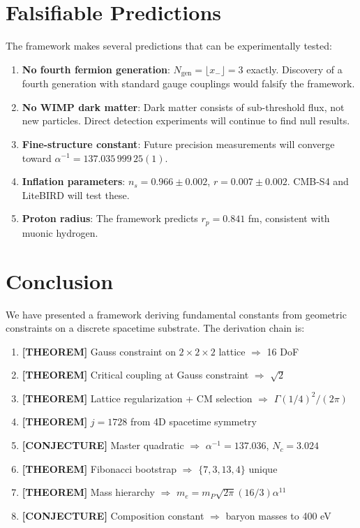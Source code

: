\documentclass[aps,prd,twocolumn,10pt,groupedaddress,superscriptaddress]{revtex4-2}
\begin{document}
\section{Falsifiable Predictions}

The framework makes several predictions that can be experimentally tested:

\begin{enumerate}
\item \textbf{No fourth fermion generation}: $N_{\text{gen}} = \lfloor x_- \rfloor = 3$ exactly. Discovery of a fourth generation with standard gauge couplings would falsify the framework.

\item \textbf{No WIMP dark matter}: Dark matter consists of sub-threshold flux, not new particles. Direct detection experiments will continue to find null results.

\item \textbf{Fine-structure constant}: Future precision measurements will converge toward $\alpha^{-1} = 137.035\,999\,25(1)$.

\item \textbf{Inflation parameters}: $n_s = 0.966 \pm 0.002$, $r = 0.007 \pm 0.002$. CMB-S4 and LiteBIRD will test these.

\item \textbf{Proton radius}: The framework predicts $r_p = 0.841$ fm, consistent with muonic hydrogen.
\end{enumerate}

\section{Conclusion}

We have presented a framework deriving fundamental constants from geometric constraints on a discrete spacetime substrate. The derivation chain is:

\begin{enumerate}
\item \textbf{[THEOREM]} Gauss constraint on $2\times2\times2$ lattice $\Rightarrow$ 16 DoF
\item \textbf{[THEOREM]} Critical coupling at Gauss constraint $\Rightarrow$ $\sqrt{2}$
\item \textbf{[THEOREM]} Lattice regularization + CM selection $\Rightarrow$ $\Gamma(1/4)^2/(2\pi)$
\item \textbf{[THEOREM]} $j = 1728$ from 4D spacetime symmetry
\item \textbf{[CONJECTURE]} Master quadratic $\Rightarrow$ $\alpha^{-1} = 137.036$, $N_c = 3.024$
\item \textbf{[THEOREM]} Fibonacci bootstrap $\Rightarrow$ $\{7, 3, 13, 4\}$ unique
\item \textbf{[THEOREM]} Mass hierarchy $\Rightarrow$ $m_e = m_P\sqrt{2\pi}(16/3)\alpha^{11}$
\item \textbf{[CONJECTURE]} Composition constant $\Rightarrow$ baryon masses to 400 eV
\end{enumerate}
\end{document}
